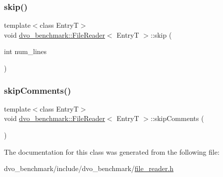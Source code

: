 \subsubsection{\texorpdfstring{skip()}{skip()}}
{\footnotesize\ttfamily template$<$class EntryT$>$ \\
void \mbox{\hyperlink{classdvo__benchmark_1_1_file_reader}{dvo\+\_\+benchmark\+::\+File\+Reader}}$<$ EntryT $>$\+::skip (\begin{DoxyParamCaption}\item[{int}]{num\+\_\+lines }\end{DoxyParamCaption})\hspace{0.3cm}{\ttfamily [inline]}}

\mbox{\label{classdvo__benchmark_1_1_file_reader_abc0efc95a5f911cf75417f7777e333f4}} 
\subsubsection{\texorpdfstring{skip\+Comments()}{skipComments()}}
{\footnotesize\ttfamily template$<$class EntryT$>$ \\
void \mbox{\hyperlink{classdvo__benchmark_1_1_file_reader}{dvo\+\_\+benchmark\+::\+File\+Reader}}$<$ EntryT $>$\+::skip\+Comments (\begin{DoxyParamCaption}{ }\end{DoxyParamCaption})\hspace{0.3cm}{\ttfamily [inline]}}



The documentation for this class was generated from the following file\+:\begin{DoxyCompactItemize}
\item 
dvo\+\_\+benchmark/include/dvo\+\_\+benchmark/\mbox{\hyperlink{file__reader_8h}{file\+\_\+reader.\+h}}\end{DoxyCompactItemize}

